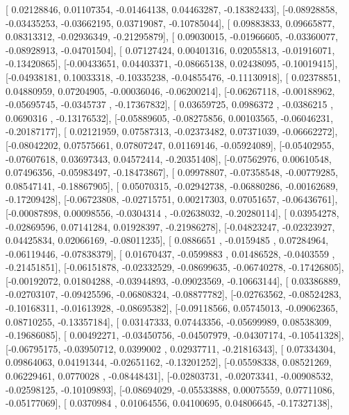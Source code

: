 \documentclass{article}
\begin{document}
       [ 0.02128846,  0.01107354, -0.01464138,  0.04463287, -0.18382433],
       [-0.08928858, -0.03435253, -0.03662195,  0.03719087, -0.10785044],
       [ 0.09883833,  0.09665877,  0.08313312, -0.02936349, -0.21295879],
       [ 0.09030015, -0.01966605, -0.03360077, -0.08928913, -0.04701504],
       [ 0.07127424,  0.00401316,  0.02055813, -0.01916071, -0.13420865],
       [-0.00433651,  0.04403371, -0.08665138,  0.02438095, -0.10019415],
       [-0.04938181,  0.10033318, -0.10335238, -0.04855476, -0.11130918],
       [ 0.02378851,  0.04880959,  0.07204905, -0.00036046, -0.06200214],
       [-0.06267118, -0.00188962, -0.05695745, -0.0345737 , -0.17367832],
       [ 0.03659725,  0.0986372 , -0.0386215 ,  0.0690316 , -0.13176532],
       [-0.05889605, -0.08275856,  0.00103565, -0.06046231, -0.20187177],
       [ 0.02121959,  0.07587313, -0.02373482,  0.07371039, -0.06662272],
       [-0.08042202,  0.07575661,  0.07807247,  0.01169146, -0.05924089],
       [-0.05402955, -0.07607618,  0.03697343,  0.04572414, -0.20351408],
       [-0.07562976,  0.00610548,  0.07496356, -0.05983497, -0.18473867],
       [ 0.09978807, -0.07358548, -0.00779285,  0.08547141, -0.18867905],
       [ 0.05070315, -0.02942738, -0.06880286, -0.00162689, -0.17209428],
       [-0.06723808, -0.02715751,  0.00217303,  0.07051657, -0.06436761],
       [-0.00087898,  0.00098556, -0.0304314 , -0.02638032, -0.20280114],
       [ 0.03954278, -0.02869596,  0.07141284,  0.01928397, -0.21986278],
       [-0.04823247, -0.02323927,  0.04425834,  0.02066169, -0.08011235],
       [ 0.0886651 , -0.0159485 ,  0.07284964, -0.06119446, -0.07838379],
       [ 0.01670437, -0.0599883 ,  0.01486528, -0.0403559 , -0.21451851],
       [-0.06151878, -0.02332529, -0.08699635, -0.06740278, -0.17426805],
       [-0.00192072,  0.01804288, -0.03944893, -0.09023569, -0.10663144],
       [ 0.03386889, -0.02703107, -0.09425596, -0.06808324, -0.08877782],
       [-0.02763562, -0.08524283, -0.10168311, -0.01613928, -0.08695382],
       [-0.09118566,  0.05745013, -0.09062365,  0.08710255, -0.13357184],
       [ 0.03147333,  0.07443356, -0.05699989,  0.08538309, -0.19686085],
       [ 0.00492271, -0.03450756, -0.04507979, -0.04307174, -0.10541328],
       [-0.06795175, -0.03950712,  0.0399002 ,  0.02937711, -0.21816343],
       [ 0.07334304,  0.09864063,  0.04191344, -0.02651162, -0.13201252],
       [-0.05598338,  0.08521269,  0.06229461,  0.0770028 , -0.08448431],
       [-0.02803731, -0.02073341, -0.00908532, -0.02598125, -0.10109893],
       [-0.08694029, -0.05533888,  0.00075559,  0.07711086, -0.05177069],
       [ 0.0370984 ,  0.01064556,  0.04100695,  0.04806645, -0.17327138],
\end{document}
